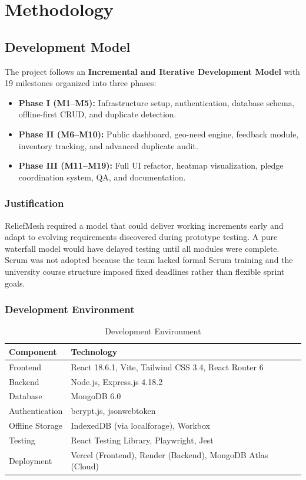 \chapter{Methodology}

\section{Development Model}

The project follows an \textbf{Incremental and Iterative Development Model} with 19 milestones organized into three phases:
\begin{itemize}[leftmargin=1.2cm]
    \item \textbf{Phase I (M1--M5):} Infrastructure setup, authentication, database schema, offline-first CRUD, and duplicate detection.
    \item \textbf{Phase II (M6--M10):} Public dashboard, geo-need engine, feedback module, inventory tracking, and advanced duplicate audit.
    \item \textbf{Phase III (M11--M19):} Full UI refactor, heatmap visualization, pledge coordination system, QA, and documentation.
\end{itemize}

\subsection{Justification}
ReliefMesh required a model that could deliver working increments early and adapt to evolving requirements discovered during prototype testing. A pure waterfall model would have delayed testing until all modules were complete. Scrum was not adopted because the team lacked formal Scrum training and the university course structure imposed fixed deadlines rather than flexible sprint goals.

\subsection{Development Environment}

\begin{table}[H]
\centering
\caption{Development Environment}
\begin{tabular}{@{}ll@{}}
\toprule
\textbf{Component} & \textbf{Technology} \\
\midrule
Frontend & React 18.6.1, Vite, Tailwind CSS 3.4, React Router 6 \\
Backend & Node.js, Express.js 4.18.2 \\
Database & MongoDB 6.0 \\
Authentication & bcrypt.js, jsonwebtoken \\
Offline Storage & IndexedDB (via localforage), Workbox \\
Testing & React Testing Library, Playwright, Jest \\
Deployment & Vercel (Frontend), Render (Backend), MongoDB Atlas (Cloud) \\
\bottomrule
\end{tabular}
\end{table}

